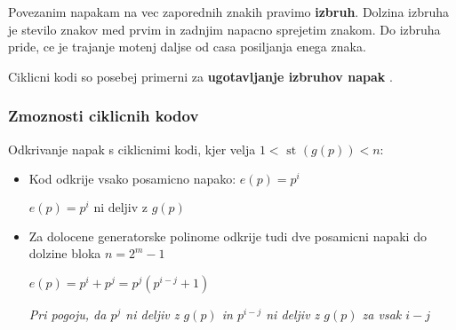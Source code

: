 \documentclass{article}
\begin{document}
\begin{multicols}{2}
	Povezanim napakam na vec zaporednih znakih pravimo \textbf{izbruh}. Dolzina izbruha je stevilo znakov med
	prvim in zadnjim napacno sprejetim znakom. Do izbruha pride, ce je trajanje motenj daljse od casa posiljanja enega znaka.

	Ciklicni kodi so posebej primerni za \textbf{ ugotavljanje izbruhov napak }.

	\subsubsection{Zmoznosti ciklicnih kodov}
	Odkrivanje napak s ciklicnimi kodi, kjer velja $1 < \text{ st }(g(p)) < n$:
	\begin{itemize}
		\item Kod odkrije vsako posamicno napako: $e(p) = p^i$
		      \begin{center}
			      \begin{math}
				      e(p) = p^i \text{ ni deljiv z } g(p)
			      \end{math}
		      \end{center}
		\item Za dolocene generatorske polinome odkrije tudi dve posamicni napaki do dolzine bloka $n = 2^m -1$
		      \begin{center}
			      \begin{math}
				      e(p) = p^i + p^j = p^j(p^{i-j} + 1)
			      \end{math}
		      \end{center}
		      \textit{Pri pogoju, da $p^j$ ni deljiv z $g(p)$ in $p^{i-j}$ ni deljiv z $g(p)$ za vsak $i-j$}


\end{itemize}
\end{multicols}
\end{document}
